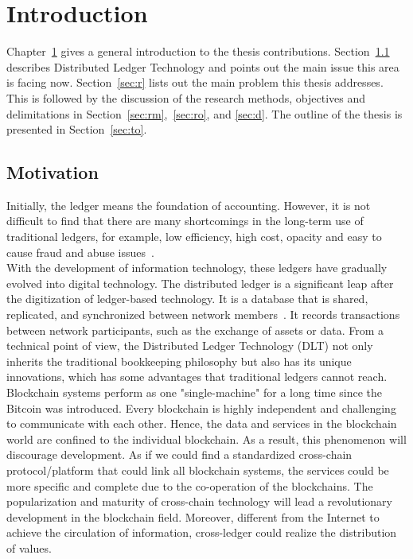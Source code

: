 \chapter{Introduction}
\label{chap:1}
\noindent Chapter~\ref{chap:1} gives a general introduction to the thesis contributions. Section~\ref{sec:m} describes Distributed Ledger Technology and points out the main issue this area is facing now. Section~\ref{sec:r} lists out the main problem this thesis addresses. This is followed by the discussion of the research methods, objectives and delimitations in Section~\ref{sec:rm},~\ref{sec:ro}, and \ref{sec:d}. The outline of the thesis is presented in Section~\ref{sec:to}. 

\section{Motivation}
\label{sec:m}

\noindent Initially, the ledger means the foundation of accounting. However, it is not difficult to find that there are many shortcomings in the long-term use of traditional ledgers, for example, low efficiency, high cost, opacity and easy to cause fraud and abuse issues~\cite{versus}.\\

\noindent With the development of information technology, these ledgers have gradually evolved into digital technology. The distributed ledger is a significant leap after the digitization of ledger-based technology. It is a database that is shared, replicated, and synchronized between network members~\cite{brakeville2016blockchain}. It records transactions between network participants, such as the exchange of assets or data. From a technical point of view, the Distributed Ledger Technology (DLT) not only inherits the traditional bookkeeping philosophy but also has its unique innovations, which has some advantages that traditional ledgers cannot reach.\\

\noindent Blockchain systems perform as one "single-machine" for a long time since the Bitcoin was introduced. Every blockchain is highly independent and challenging to communicate with each other. Hence, the data and services in the blockchain world are confined to the individual blockchain. As a result, this phenomenon will discourage development. As if we could find a standardized cross-chain protocol/platform that could link all blockchain systems, the services could be more specific and complete due to the co-operation of the blockchains. The popularization and maturity of cross-chain technology will lead a revolutionary development in the blockchain field. Moreover, different from the Internet to achieve the circulation of information, cross-ledger could realize the distribution of values.\\

